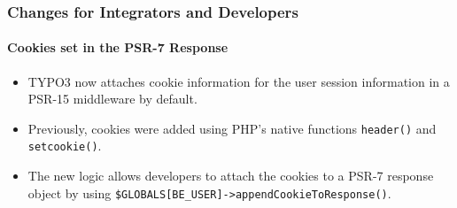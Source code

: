 %

\begin{frame}[fragile]
	\frametitle{Changes for Integrators and Developers}
	\framesubtitle{Cookies set in the PSR-7 Response}

	\begin{itemize}
		\item TYPO3 now attaches cookie information for the user session information
			in a PSR-15 middleware by default.
		\item Previously, cookies were added using PHP's native functions\newline
			\smaller\texttt{header()} and \texttt{setcookie()}\normalsize.
		\item The new logic allows developers to attach the cookies to a PSR-7
			response object by using\newline
			\smaller\texttt{\$GLOBALS[BE\_USER]->appendCookieToResponse()}\normalsize.
	\end{itemize}
\end{frame}

